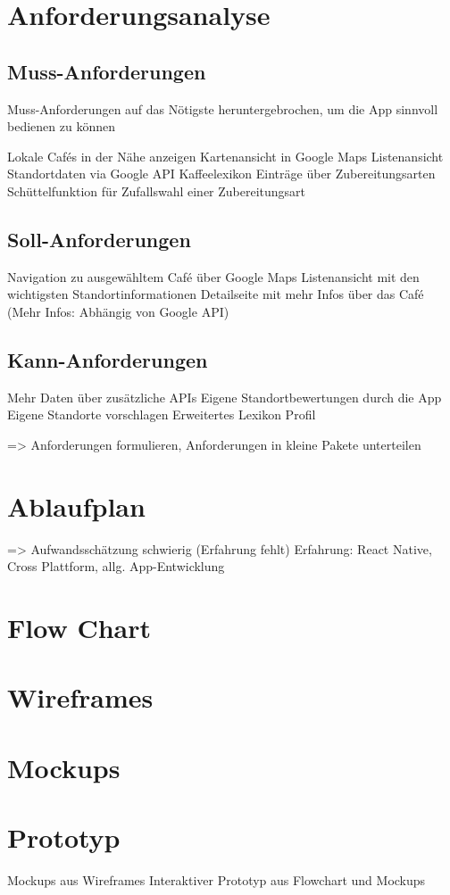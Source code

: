 \section{Anforderungsanalyse}
\subsection{Muss-Anforderungen}
Muss-Anforderungen auf das Nötigste heruntergebrochen, um die App sinnvoll bedienen zu können

Lokale Cafés in der Nähe anzeigen
Kartenansicht in Google Maps
Listenansicht
Standortdaten via Google API
Kaffeelexikon
Einträge über Zubereitungsarten
Schüttelfunktion für Zufallswahl einer Zubereitungsart

\subsection{Soll-Anforderungen}
Navigation zu ausgewähltem Café über Google Maps
Listenansicht mit den wichtigsten Standortinformationen
Detailseite mit mehr Infos über das Café (Mehr Infos: Abhängig von Google API)

\subsection{Kann-Anforderungen}
Mehr Daten über zusätzliche APIs
Eigene Standortbewertungen durch die App
Eigene Standorte vorschlagen
Erweitertes Lexikon
Profil

=> Anforderungen formulieren, Anforderungen in kleine Pakete unterteilen


\section{Ablaufplan}
=> Aufwandsschätzung schwierig (Erfahrung fehlt)
Erfahrung: React Native, Cross Plattform, allg. App-Entwicklung

\section{Flow Chart}
\section{Wireframes}
\section{Mockups}
\section{Prototyp}
Mockups aus Wireframes
Interaktiver Prototyp aus Flowchart und Mockups




